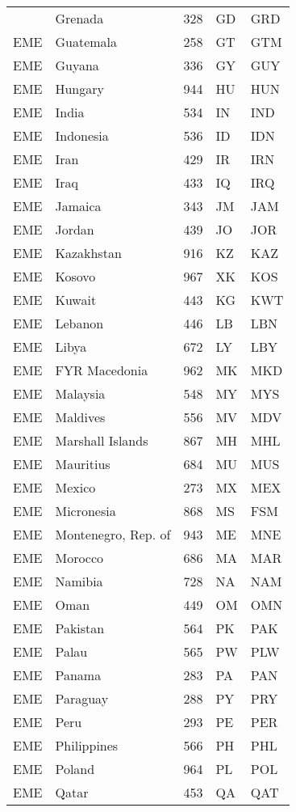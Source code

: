 \documentclass[12pt,a4paper,oldfontcommands]{memoir}
\begin{document}
\begin{ThreePartTable}
\begin{longtable}
{EME} & Grenada & 328 & GD & GRD \\
{EME} & Guatemala & 258 & GT & GTM \\
{EME} & Guyana & 336 & GY & GUY \\
{EME} & Hungary & 944 & HU & HUN \\
{EME} & India & 534 & IN & IND \\
{EME} & Indonesia & 536 & ID & IDN \\
{EME} & Iran & 429 & IR & IRN \\
{EME} & Iraq & 433 & IQ & IRQ \\
{EME} & Jamaica & 343 & JM & JAM \\
{EME} & Jordan & 439 & JO & JOR \\
{EME} & Kazakhstan & 916 & KZ & KAZ \\
{EME} & Kosovo & 967 & XK & KOS \\
{EME} & Kuwait & 443 & KG & KWT \\
{EME} & Lebanon & 446 & LB & LBN \\
{EME} & Libya & 672 & LY & LBY \\
{EME} & FYR Macedonia & 962 & MK & MKD \\
{EME} & Malaysia & 548 & MY & MYS \\
{EME} & Maldives & 556 & MV & MDV \\
{EME} & Marshall Islands & 867 & MH & MHL \\
{EME} & Mauritius & 684 & MU & MUS \\
{EME} & Mexico & 273 & MX & MEX \\
{EME} & Micronesia & 868 & MS & FSM \\
{EME} & Montenegro, Rep. of & 943 & ME & MNE \\
{EME} & Morocco & 686 & MA & MAR \\
{EME} & Namibia & 728 & NA & NAM \\
{EME} & Oman & 449 & OM & OMN \\
{EME} & Pakistan & 564 & PK & PAK \\
{EME} & Palau & 565 & PW & PLW \\
{EME} & Panama & 283 & PA & PAN \\
{EME} & Paraguay & 288 & PY & PRY \\
{EME} & Peru & 293 & PE & PER \\
{EME} & Philippines & 566 & PH & PHL \\
{EME} & Poland & 964 & PL & POL \\
{EME} & Qatar & 453 & QA & QAT \\

\end{longtable}
\end{ThreePartTable}
\end{document}
